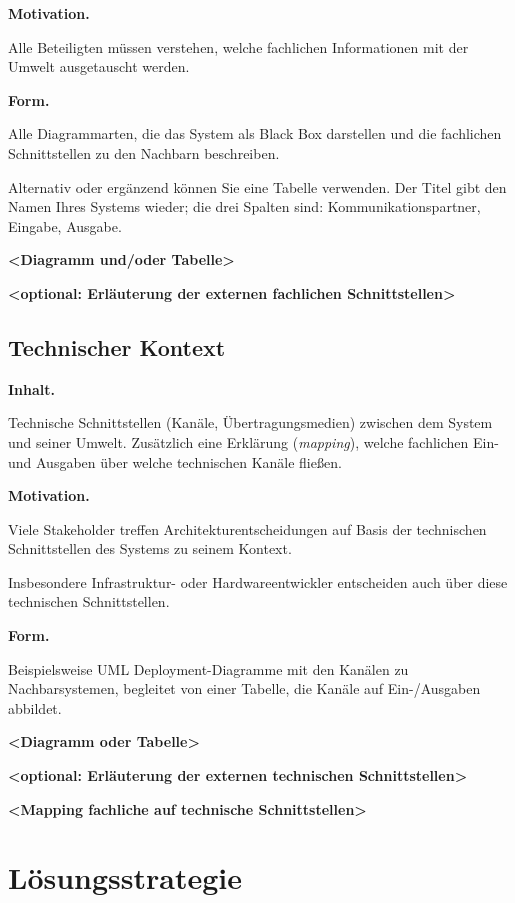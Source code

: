 \documentclass[]{article}
\begin{document}
\textbf{Motivation.}

Alle Beteiligten müssen verstehen, welche fachlichen Informationen mit
der Umwelt ausgetauscht werden.

\textbf{Form.}

Alle Diagrammarten, die das System als Black Box darstellen und die
fachlichen Schnittstellen zu den Nachbarn beschreiben.

Alternativ oder ergänzend können Sie eine Tabelle verwenden. Der Titel
gibt den Namen Ihres Systems wieder; die drei Spalten sind:
Kommunikationspartner, Eingabe, Ausgabe.

\textbf{\textless{}Diagramm und/oder Tabelle\textgreater{}}

\textbf{\textless{}optional: Erläuterung der externen fachlichen
Schnittstellen\textgreater{}}

\subsection{Technischer Kontext}\label{_technischer_kontext}

\textbf{Inhalt.}

Technische Schnittstellen (Kanäle, Übertragungsmedien) zwischen dem
System und seiner Umwelt. Zusätzlich eine Erklärung (\emph{mapping}),
welche fachlichen Ein- und Ausgaben über welche technischen Kanäle
fließen.

\textbf{Motivation.}

Viele Stakeholder treffen Architekturentscheidungen auf Basis der
technischen Schnittstellen des Systems zu seinem Kontext.

Insbesondere Infrastruktur- oder Hardwareentwickler entscheiden auch
über diese technischen Schnittstellen.

\textbf{Form.}

Beispielsweise UML Deployment-Diagramme mit den Kanälen zu
Nachbarsystemen, begleitet von einer Tabelle, die Kanäle auf
Ein-/Ausgaben abbildet.

\textbf{\textless{}Diagramm oder Tabelle\textgreater{}}

\textbf{\textless{}optional: Erläuterung der externen technischen
Schnittstellen\textgreater{}}

\textbf{\textless{}Mapping fachliche auf technische
Schnittstellen\textgreater{}}

\section{Lösungsstrategie}\label{section-solution-strategy}
\end{document}
